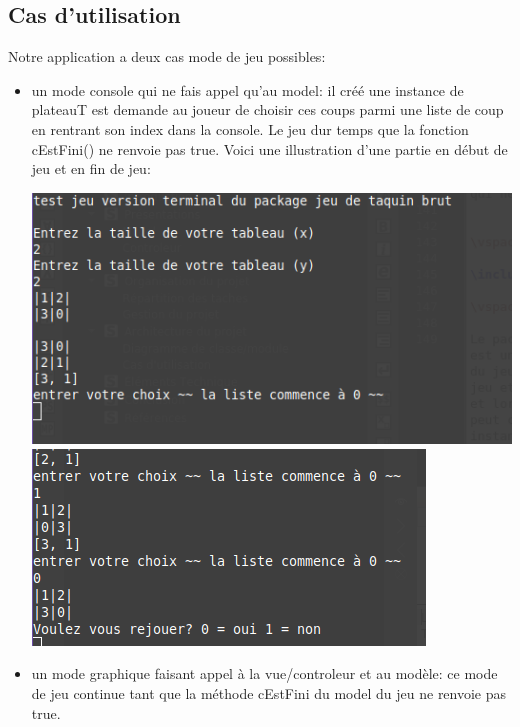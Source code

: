 \documentclass[12pt]{article}
\begin{document}
\subsection{Cas d'utilisation}
Notre application a deux cas mode de jeu possibles:
\begin{itemize}
\item un mode console qui ne fais appel qu'au  model: il créé une instance de plateauT est demande au joueur de choisir ces coups parmi une liste de coup en rentrant son index dans la console. Le jeu dur temps que la fonction cEstFini() ne renvoie pas true. Voici une illustration d'une partie en début de jeu et en fin de jeu:



\begin{center}
\includegraphics[scale=0.23]{images/CaptureGraphDeb.png}
\includegraphics[scale=0.31]{images/captureGraphFin.png}
\end{center}

\item un mode graphique faisant appel à la vue/controleur et au modèle: ce mode de jeu continue tant que la méthode cEstFini du model du jeu ne renvoie pas true.



\end{itemize}
\end{document}
